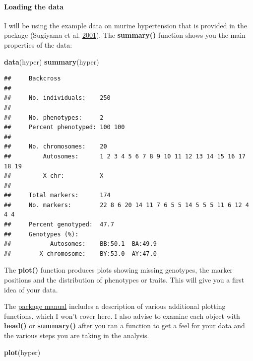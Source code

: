 \documentclass[12pt,]{book}
\newenvironment{Shaded}{\begin{snugshade}}{\end{snugshade}}
\newcommand{\KeywordTok}[1]{\textcolor[rgb]{0.13,0.29,0.53}{\textbf{{#1}}}}
\newcommand{\NormalTok}[1]{{#1}}
\let\oldparagraph\paragraph
\renewcommand{\paragraph}[1]{\oldparagraph{#1}\mbox{}}
\theoremstyle{definition}
\theoremstyle{definition}
\theoremstyle{remark}
\begin{document}
\paragraph{Loading the data}\label{loading-the-data}

I will be using the example data on murine hypertension that is provided
in the package (Sugiyama et al.
\protect\hyperlink{ref-Sugiyama200170}{2001}). The \textbf{summary()}
function shows you the main properties of the data:

\begin{Shaded}
\begin{Highlighting}[]
\KeywordTok{data}\NormalTok{(hyper)}
\KeywordTok{summary}\NormalTok{(hyper)}
\end{Highlighting}
\end{Shaded}

\begin{verbatim}
##     Backcross
## 
##     No. individuals:    250 
## 
##     No. phenotypes:     2 
##     Percent phenotyped: 100 100 
## 
##     No. chromosomes:    20 
##         Autosomes:      1 2 3 4 5 6 7 8 9 10 11 12 13 14 15 16 17 18 19 
##         X chr:          X 
## 
##     Total markers:      174 
##     No. markers:        22 8 6 20 14 11 7 6 5 5 14 5 5 5 11 6 12 4 4 4 
##     Percent genotyped:  47.7 
##     Genotypes (%):    
##           Autosomes:    BB:50.1  BA:49.9 
##        X chromosome:    BY:53.0  AY:47.0
\end{verbatim}

The \textbf{plot()} function produces plots showing missing genotypes,
the marker positions and the distribution of phenotypes or traits. This
will give you a first idea of your data.

The \href{http://www.rqtl.org/tutorials/rqtltour.pdf}{package manual}
includes a description of various additional plotting functions, which I
won't cover here. I also advise to examine each object with
\textbf{head()} or \textbf{summary()} after you ran a function to get a
feel for your data and the various steps you are taking in the analysis.

\begin{Shaded}
\begin{Highlighting}[]
\KeywordTok{plot}\NormalTok{(hyper)}
\end{Highlighting}
\end{Shaded}
\end{document}
